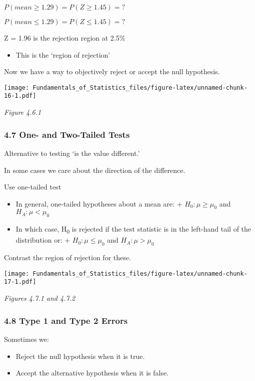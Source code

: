 \documentclass[]{article}
\providecommand{\tightlist}{%
  \setlength{\itemsep}{0pt}\setlength{\parskip}{0pt}}
\begin{document}
\(P(mean \ge 1.29) = P(Z \ge 1.45) = ?\)

\(P(mean \le 1.29) = P(Z \le 1.45) = ?\)

Z = 1.96 is the rejection region at 2.5\%

\begin{itemize}
\tightlist
\item
  This is the `region of rejection'
\end{itemize}

Now we have a way to objectively reject or accept the null hypothesis.

\texttt{[image: Fundamentals\_of\_Statistics\_files/figure-latex/unnamed-chunk-16-1.pdf]}

\emph{Figure 4.6.1}

\hypertarget{one--and-two-tailed-tests}{%
\subsubsection{4.7 One- and Two-Tailed
Tests}\label{one--and-two-tailed-tests}}

Alternative to testing `is the value different.'

In some cases we care about the direction of the difference.

Use one-tailed test

\begin{itemize}
\tightlist
\item
  In general, one-tailed hypotheses about a mean are: +
  \(H_0:\mu\ge\mu_0\) and \(H_A:\mu<\mu_0\)
\item
  In which case, H\textsubscript{0} is rejected if the test statistic is
  in the left-hand tail of the distribution or: + \(H_0:\mu\le\mu_0\)
  and \(H_A:\mu>\mu_0\)
\end{itemize}

Contrast the region of rejection for these.

\texttt{[image: Fundamentals\_of\_Statistics\_files/figure-latex/unnamed-chunk-17-1.pdf]}

\emph{Figures 4.7.1 and 4.7.2}

\hypertarget{type-1-and-type-2-errors}{%
\subsubsection{4.8 Type 1 and Type 2
Errors}\label{type-1-and-type-2-errors}}

Sometimes we:

\begin{itemize}
\tightlist
\item
  Reject the null hypothesis when it is true.
\item
  Accept the alternative hypothesis when it is false.
\end{itemize}
\end{document}
